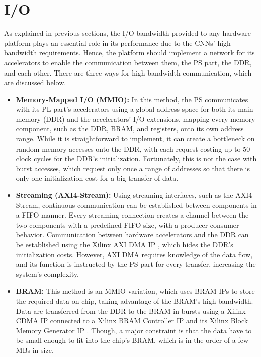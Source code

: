 \section{I/O}
\label{sec:IO}
As explained in previous sections, the I/O bandwidth provided to any hardware platform plays an essential role in its performance due to the CNNs' high bandwidth requirements. Hence, the platform should implement a network for its accelerators to enable the communication between them, the PS part, the DDR, and each other. There are three ways for high bandwidth communication, which are discussed below.
\begin{itemize}
	\item \textbf{Memory-Mapped I/O (MMIO):} In this method, the PS communicates with its PL part's accelerators using a global address space for both its main memory (DDR) and the accelerators' I/O extensions, mapping every memory component, such as the DDR, BRAM, and registers, onto its own address range. While it is straightforward to implement, it can create a bottleneck on random memory accesses onto the DDR, with each request costing up to 50 clock cycles for the DDR's initialization. Fortunately, this is not the case with burst accesses, which request only once a range of addresses so that there is only one initialization cost for a big transfer of data.
	\item \textbf{Streaming (AXI4-Stream):} Using streaming interfaces, such as the AXI4-Stream, continuous communication can be established between components in a FIFO manner. Every streaming connection creates a channel between the two components with a predefined FIFO size, with a producer-consumer behavior. Communication between hardware accelerators and the DDR can be established using the Xilinx AXI DMA IP \cite{PG021-AXI-DMA-Product-Guide}, which hides the DDR's initialization costs. However, AXI DMA requires knowledge of the data flow, and its function is instructed by the PS part for every transfer, increasing the system's complexity.
	\item \textbf{BRAM:} This method is an MMIO variation, which uses BRAM IPs to store the required data on-chip, taking advantage of the BRAM's high bandwidth. Data are transferred from the DDR to the BRAM in bursts using a Xilinx CDMA IP \cite{PG034-AXI-Central-Direct-Memory-Access-Product-Guide} connected to a Xilinx BRAM Controller IP \cite{PG078-AXI-BRAM-Controller-Product-Guide} and its Xilinx Block Memory Generator IP \cite{PG058-Block-Memory-Generator-Product-Guide}. Though, a major constraint is that the data have to be small enough to fit into the chip's BRAM, which is in the order of a few MBs in size.
\end{itemize}

